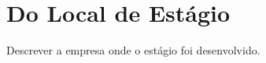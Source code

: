 \chapter{Do Local de Estágio}
\label{cap:localestagio}

Descrever a empresa onde o estágio foi desenvolvido.